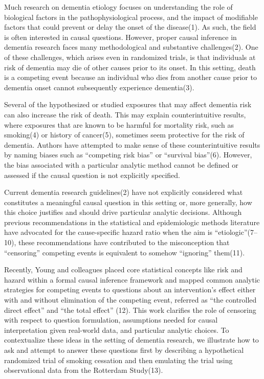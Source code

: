 \documentclass[
]{book}
\begin{document}
\newpage

Much research on dementia etiology focuses on understanding the role of biological factors in the pathophysiological process, and the impact of modifiable factors that could prevent or delay the onset of the disease(1). As such, the field is often interested in causal questions. However, proper causal inference in dementia research faces many methodological and substantive challenges(2). One of these challenges, which arises even in randomized trials, is that individuals at risk of dementia may die of other causes prior to its onset. In this setting, death is a competing event because an individual who dies from another cause prior to dementia onset cannot subsequently experience dementia(3).

Several of the hypothesized or studied exposures that may affect dementia risk can also increase the risk of death. This may explain counterintuitive results, where exposures that are known to be harmful for mortality risk, such as smoking(4) or history of cancer(5), sometimes seem protective for the risk of dementia. Authors have attempted to make sense of these counterintuitive results by naming biases such as ``competing risk bias'' or ``survival bias''(6). However, the bias associated with a particular analytic method cannot be defined or assessed if the causal question is not explicitly specified.

Current dementia research guidelines(2) have not explicitly considered what constitutes a meaningful causal question in this setting or, more generally, how this choice justifies and should drive particular analytic decisions. Although previous recommendations in the statistical and epidemiologic methods literature have advocated for the cause-specific hazard ratio when the aim is ``etiologic''(7--10), these recommendations have contributed to the misconception that ``censoring'' competing events is equivalent to somehow ``ignoring'' them(11).

Recently, Young and colleagues placed core statistical concepts like risk and hazard within a formal causal inference framework and mapped common analytic strategies for competing events to questions about an intervention's effect either with and without elimination of the competing event, referred as ``the controlled direct effect'' and ``the total effect'' (12). This work clarifies the role of censoring with respect to question formulation, assumptions needed for causal interpretation given real-world data, and particular analytic choices. To contextualize these ideas in the setting of dementia research, we illustrate how to ask and attempt to answer these questions first by describing a hypothetical randomized trial of smoking cessation and then emulating the trial using observational data from the Rotterdam Study(13).
\end{document}
